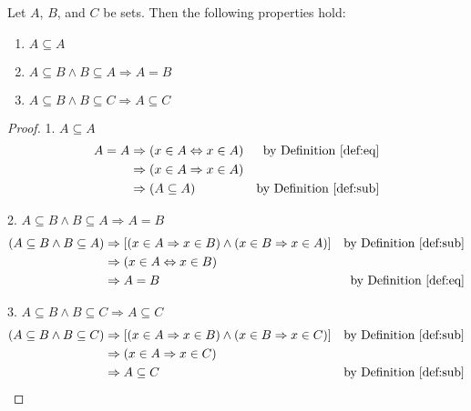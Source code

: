 \documentclass[../main.tex]{subfiles}
\begin{document}
\begin{prop} \label{prop:sub}
    Let $A$, $B$, and $C$ be sets.
    Then the following properties hold:
    \begin{enumerate}
        \item $A \subseteq A$
        \item $A \subseteq B \wedge B \subseteq A \Rightarrow A = B$
        \item $A \subseteq B \wedge B \subseteq C \Rightarrow A \subseteq C$
    \end{enumerate}
\end{prop}
\begin{proof}
    1. $A \subseteq A$
    \begin{align*}
        A = A &\Rightarrow (x \in A \Leftrightarrow x \in A) &\text{by Definition~\ref{def:eq}}\\
              &\Rightarrow (x \in A \Rightarrow x \in A)\\
              &\Rightarrow (A \subseteq A) & \text{by Definition~\ref{def:sub}}
    \end{align*}

    2. $A \subseteq B \wedge B \subseteq A \Rightarrow A = B$
    \begin{align*}
        (A \subseteq B \wedge B \subseteq A) &\Rightarrow [(x \in A \Rightarrow x \in B) \wedge (x \in B \Rightarrow x \in A)] &\text{by Definition~\ref{def:sub}}\\
                                             &\Rightarrow (x \in A \Leftrightarrow x \in B)\\
                                             &\Rightarrow A = B &\text{by Definition~\ref{def:eq}}
    \end{align*}

    3. $A \subseteq B \wedge B \subseteq C \Rightarrow A \subseteq C$
    \begin{align*}
        (A \subseteq B \wedge B \subseteq C) &\Rightarrow [(x \in A \Rightarrow x \in B) \wedge (x \in B \Rightarrow x \in C)] &\text{by Definition~\ref{def:sub}}\\
                                             &\Rightarrow (x \in A \Rightarrow x \in C)\\
                                             &\Rightarrow A \subseteq C &\text{by Definition~\ref{def:sub}}
    \end{align*}
\end{proof}
\end{document}
